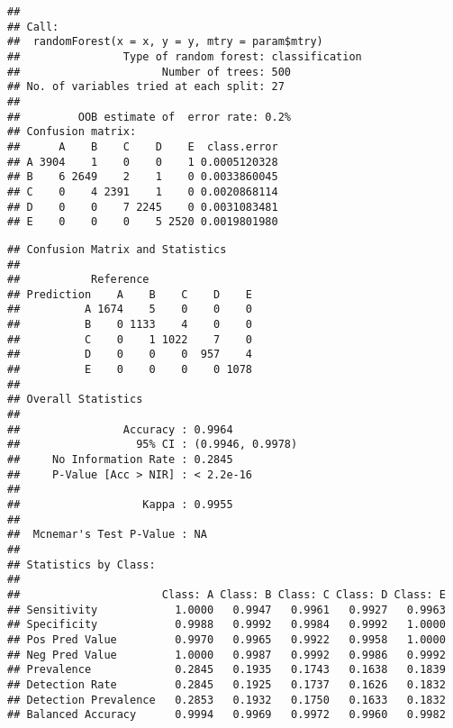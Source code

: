 \documentclass[]{article}
\newenvironment{Shaded}{\begin{snugshade}}{\end{snugshade}}
\newcommand{\KeywordTok}[1]{\textcolor[rgb]{0.13,0.29,0.53}{\textbf{#1}}}
\newcommand{\DataTypeTok}[1]{\textcolor[rgb]{0.13,0.29,0.53}{#1}}
\newcommand{\StringTok}[1]{\textcolor[rgb]{0.31,0.60,0.02}{#1}}
\newcommand{\CommentTok}[1]{\textcolor[rgb]{0.56,0.35,0.01}{\textit{#1}}}
\newcommand{\OperatorTok}[1]{\textcolor[rgb]{0.81,0.36,0.00}{\textbf{#1}}}
\newcommand{\NormalTok}[1]{#1}
\begin{document}
\begin{verbatim}
## 
## Call:
##  randomForest(x = x, y = y, mtry = param$mtry) 
##                Type of random forest: classification
##                      Number of trees: 500
## No. of variables tried at each split: 27
## 
##         OOB estimate of  error rate: 0.2%
## Confusion matrix:
##      A    B    C    D    E  class.error
## A 3904    1    0    0    1 0.0005120328
## B    6 2649    2    1    0 0.0033860045
## C    0    4 2391    1    0 0.0020868114
## D    0    0    7 2245    0 0.0031083481
## E    0    0    0    5 2520 0.0019801980
\end{verbatim}

\begin{Shaded}
\end{Shaded}

\begin{verbatim}
## Confusion Matrix and Statistics
## 
##           Reference
## Prediction    A    B    C    D    E
##          A 1674    5    0    0    0
##          B    0 1133    4    0    0
##          C    0    1 1022    7    0
##          D    0    0    0  957    4
##          E    0    0    0    0 1078
## 
## Overall Statistics
##                                           
##                Accuracy : 0.9964          
##                  95% CI : (0.9946, 0.9978)
##     No Information Rate : 0.2845          
##     P-Value [Acc > NIR] : < 2.2e-16       
##                                           
##                   Kappa : 0.9955          
##                                           
##  Mcnemar's Test P-Value : NA              
## 
## Statistics by Class:
## 
##                      Class: A Class: B Class: C Class: D Class: E
## Sensitivity            1.0000   0.9947   0.9961   0.9927   0.9963
## Specificity            0.9988   0.9992   0.9984   0.9992   1.0000
## Pos Pred Value         0.9970   0.9965   0.9922   0.9958   1.0000
## Neg Pred Value         1.0000   0.9987   0.9992   0.9986   0.9992
## Prevalence             0.2845   0.1935   0.1743   0.1638   0.1839
## Detection Rate         0.2845   0.1925   0.1737   0.1626   0.1832
## Detection Prevalence   0.2853   0.1932   0.1750   0.1633   0.1832
## Balanced Accuracy      0.9994   0.9969   0.9972   0.9960   0.9982
\end{verbatim}
\end{document}

